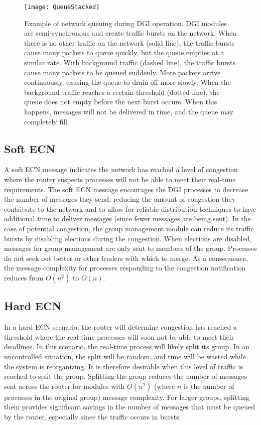 \begin{figure}
\centering
\texttt{[image: QueueStacked]}
\caption[
Example of network queuing during \ac{DGI} operation.
]{
Example of network queuing during \ac{DGI} operation.
\ac{DGI} modules are semi-synchronous and create traffic bursts on the network.
When there is no other traffic on the network (solid line), the traffic bursts cause many packets to queue quickly, but the queue empties at a similar rate.
With background traffic (dashed line), the traffic bursts cause many packets to be queued suddenly. More packets arrive continuously, causing the queue to drain off more slowly.
When the background traffic reaches a certain threshold (dotted line), the queue does not empty before the next burst occurs. When this happens, messages will not be delivered in time, and the queue may completely fill.
}
\label{fig:queue-types}
\end{figure}

\subsection{Soft \ac{ECN}}

A soft \ac{ECN} message indicates the network has reached a level of congestion where the router suspects processes will not be able to meet their real-time requirements.
The soft \ac{ECN} message encourages the \ac{DGI} processes to decrease the number of messages they send, reducing the amount of congestion they contribute to the network and to allow for reliable distribution techniques to have additional time to deliver messages (since fewer messages are being sent).
In the case of potential congestion, the group management module can reduce its traffic bursts by disabling elections during the congestion.
When elections are disabled, messages for group management are only sent to members of the group.
Processes do not seek out better or other leaders with which to merge.
As a consequence, the message complexity for processes responding to the congestion notification reduces from $O(n^2)$ to $O(n)$.

\subsection{Hard \ac{ECN}}

In a hard \ac{ECN} scenario, the router will determine congestion has reached a threshold where the real-time processes will soon not be able to meet their deadlines.
In this scenario, the real-time process will likely split its group.
In an uncontrolled situation, the split will be random, and time will be wasted while the system is reorganizing.
It is therefore desirable when this level of traffic is reached to split the group.
Splitting the group reduces the number of messages sent across the router for modules with $O(n^2)$ (where $n$ is the number of processes in the original group) message complexity.
For larger groups, splitting them provides significant savings in the number of messages that must be queued by the router, especially since the traffic occurs in bursts.

